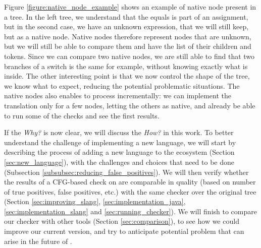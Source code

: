 Figure \ref{figure:native_node_example} shows an example of native node present in a \slang{} tree. In the left tree, we understand that the equals is part of an assignment, but in the second case, we have an unknown expression, that we will still keep, but as a native node.
Native nodes therefore represent nodes that are unknown, but we will still be able to compare them and have the list of their children and tokens. 
Since we can compare two native nodes, we are still able to find that two branches of a switch is the same for example, without knowing exactly what is inside. 
The other interesting point is that we now control the shape of the tree, we know what to expect, reducing the potential problematic situations.
The native nodes also enables to process incrementally: we can implement the translation only for a few nodes, letting the others as native, and already be able to run some of the checks and see the first results.


If the \emph{Why?} is now clear, we will discuss the \emph{How?} in this work. 
To better understand the challenge of implementing a new language, we will start by describing the process of adding a new language to the ecosystem (Section \ref{sec:new_language}), with the challenges and choices that need to be done (Subsection \ref{subsubsec:reducing_false_positives}). 
We will then verify whether the results of a CFG-based check on \slang{} are comparable in quality (based on number of true positives, false positives, etc.) with the same checker over the original tree (Section \ref{sec:improving_slang}, \ref{sec:implementation_java}, \ref{sec:implementation_slang} and \ref{sec:running_checker}).
We will finish to compare our checker with other tools (Section \ref{sec:comparison}), to see how we could improve our current version, and try to anticipate potential problem that can arise in the future of \slang{}.




